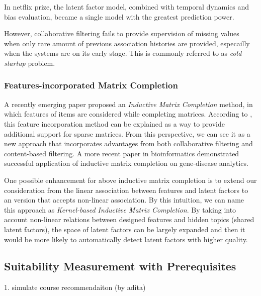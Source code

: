 \documentclass{article} %
\begin{document}
In netflix prize, the latent factor model, combined with temporal dynamics and
bias evaluation, became a single model with the greatest prediction power.

However, collaborative filtering fails to provide supervision of missing
values when only rare amount of previous association histories are provided,
especailly when the systems are on its early stage.
This is commonly referred to as {\it cold startup} problem.

\subsubsection{Features-incorporated Matrix Completion}
A recently emerging paper proposed an {\it Inductive Matrix Completion} method, in
which features of items are considered while completing matrices. 
According to \cite{jain2013provable}, this feature incorporation method can be
explained as a way to provide additional support for sparse matrices. 
From this perspective, we can see it as a new approach that incorporates
advantages from both collaborative filtering and content-based filtering. 
A more recent paper \cite{natarajan2014inductive} in bioinformatics 
demonstrated successful application of inductive matrix completion on
gene-disease analytics.

One possible enhancement for above inductive matrix completion is to
extend our consideration from the linear association between features and
latent factors to an version that accepts non-linear association.
By this intuition, we can name this approach as 
    {\it Kernel-based Inductive Matrix Completion}.
By taking into account non-linear relations between designed features and hidden
topics (shared latent factors), the space of latent factors can be largely
expanded and then it would be more likely to automatically detect latent
factors with higher quality. 
 

\subsection{Suitability Measurement with Prerequisites}
1. simulate course recommendaiton (by adita)
\end{document}
